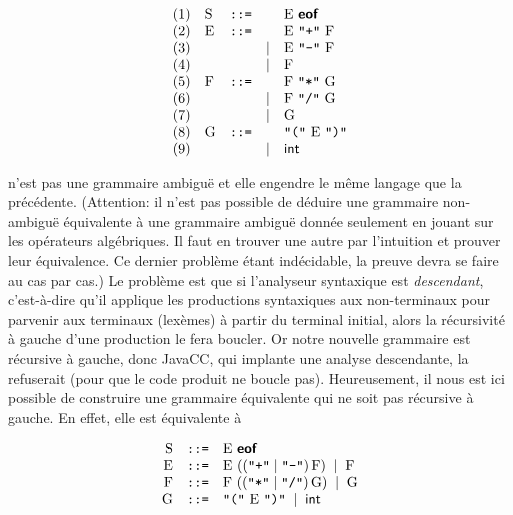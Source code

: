 \documentclass[11pt,a4paper]{article}
\newcommand{\assign}{\mbox{\texttt{::=}}\xspace}
\newcommand{\JavaCC}{\textsf{JavaCC}\xspace}
\newcommand{\str}[1]{\texttt{"{#1}"}}
\newcommand{\eof}{\textsf{\textbf{eof}}\xspace}
\begin{document}
\[
\begin{array}{llcrl}
  (1) & \textrm{S} & \assign &      & \textrm{E} \ \eof\\
  (2) & \textrm{E} & \assign &      & \textrm{E} \ \str{+} \ \textrm{F}\\
  (3) &   &         & \mid & \textrm{E} \ \str{-} \ \textrm{F}\\
  (4) &   &         & \mid & \textrm{F}\\
  (5) & \textrm{F} & \assign &      & \textrm{F} \ \str{*} \ \textrm{G}\\
  (6) &   &         & \mid & \textrm{F} \ \str{/} \ \textrm{G}\\
  (7) &   &         & \mid & \textrm{G}\\
  (8) & \textrm{G} & \assign &      & \str{(} \ \textrm{E} \ \str{)}\\
  (9) &   &         & \mid & \textsf{int}
\end{array}
\]

\noindent n'est pas une grammaire ambiguë et elle engendre le même
langage que la précédente. (Attention: il n'est pas possible de
déduire une grammaire non-ambiguë équivalente à une grammaire ambiguë
donnée seulement en jouant sur les opérateurs algébriques. Il faut en
trouver une autre par l'intuition et prouver leur équivalence. Ce
dernier problème étant indécidable, la preuve devra se faire au cas
par cas.) Le problème est que si l'analyseur syntaxique est
\emph{descendant}, c'est-à-dire qu'il applique les productions
syntaxiques aux non-terminaux pour parvenir aux terminaux (lexèmes) à
partir du terminal initial, alors la récursivité à gauche d'une
production le fera boucler. Or notre nouvelle grammaire est récursive
à gauche, donc \JavaCC, qui implante une analyse descendante, la
refuserait (pour que le code produit ne boucle pas). Heureusement, il
nous est ici possible de construire une grammaire équivalente qui ne
soit pas récursive à gauche. En effet, elle est équivalente à

\[
\begin{array}{rcl}
  \textrm{S} & \assign & \textrm{E} \ \eof\\
  \textrm{E} & \assign & \textrm{E} \ ((\str{+} \mid
  \str{-}) \, \textrm{F}) \; \mid \; \textrm{F}\\
  \textrm{F} & \assign & \textrm{F} \ ((\str{*} \mid
  \str{/}) \, \textrm{G}) \; \mid \; \textrm{G}\\
  \textrm{G} & \assign & \str{(} \ \textrm{E} \ \str{)}
  \; \mid \; \textsf{int}
\end{array}
\]
\end{document}

